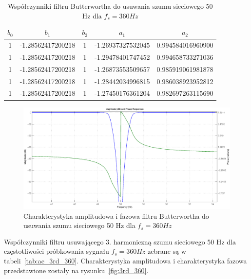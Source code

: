 \begin{table}[H]
\begin{center}
\begin{tabular}{|c|c|c|c|c|}
\hline
        $b_0$ & $b_1$ & $b_2$ & $a_1$ & $a_2$ \\
\hline
        1& -1.28562417200218& 1& -1.26937327532045&        0.994584016960900\\
\hline
        1& -1.28562417200218& 1& -1.29478401747452&        0.994658733271036\\
\hline
        1& -1.28562417200218& 1& -1.26873553509657&        0.985919061981878\\
\hline
        1& -1.28562417200218& 1& -1.28442034996815&        0.986038923952812\\
\hline
        1& -1.28562417200218& 1& -1.27450176361204&        0.982697263115690\\
\hline
\end{tabular} 
\caption{Współczynniki filtru Butterwortha do usuwania szumu sieciowego 50 Hz dla $f_s=360 Hz$}
\label{tab:ac_360}
\end{center}
\end{table}

\begin{figure}[h]
\centering
	\includegraphics[width=\textwidth]{ECG_BASELINE/figures/50hz_360.eps}
\caption{Charakterystyka amplitudowa i fazowa filtru Butterwortha do usuwania szumu sieciowego 50 Hz dla $f_s=360 Hz$}
\label{fig:50hz_360}
\end{figure}


Współczynniki filtru usuwającego 3. harmoniczną szumu sieciowego 50 Hz dla częstotliwości próbkowania sygnału $f_s = 360 Hz$ zebrane są w tabeli~\ref{tab:ac_3rd_360}. Charakterystyka amplitudowa i charakterystyka fazowa przedstawione zostały na rysunku~\ref{fig:3rd_360}.

